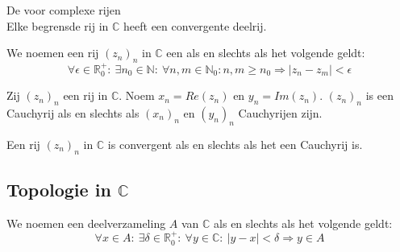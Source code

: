 \documentclass[main.tex]{subfiles}
\begin{document}
\begin{st}
  De  voor complexe rijen\\
  Elke begrensde rij in $\mathbb{C}$ heeft een convergente deelrij.
\end{st}

\begin{de}
  We noemen een rij $(z_{n})_{n}$ in $\mathbb{C}$ een  als en slechts als het volgende geldt:
  \[ \forall \epsilon \in \mathbb{R}_{0}^{+}:\ \exists n_{0}\in \mathbb{N}:\ \forall n,m\in \mathbb{N}_{0}: n,m\ge n_{0} \Rightarrow |z_{n}-z_{m}| < \epsilon \]
\end{de}

\begin{pr}
  Zij $(z_{n})_{n}$ een rij in $\mathbb{C}$.
  Noem $x_{n} = Re(z_{n})$ en $y_{n} = Im(z_{n})$.
  $(z_{n})_{n}$ is een Cauchyrij als en slechts als $(x_{n})_{n}$ en $(y_{n})_{n}$ Cauchyrijen zijn.
\end{pr}

\begin{st}
  Een rij $(z_{n})_{n}$ in $\mathbb{C}$ is convergent als en slechts als het een Cauchyrij is.
\end{st}

\subsection{Topologie in $\mathbb{C}$}
\label{sec:topologie-mathbbc}

\begin{de}
  We noemen een deelverzameling $A$ van $\mathbb{C}$  als en slechts als het volgende geldt:
  \[ \forall x\in A:\ \exists \delta \in \mathbb{R}_{0}^{+}:\ \forall y\in \mathbb{C}:\ |y-x| < \delta \Rightarrow y \in A \]
\end{de}
\end{document}
